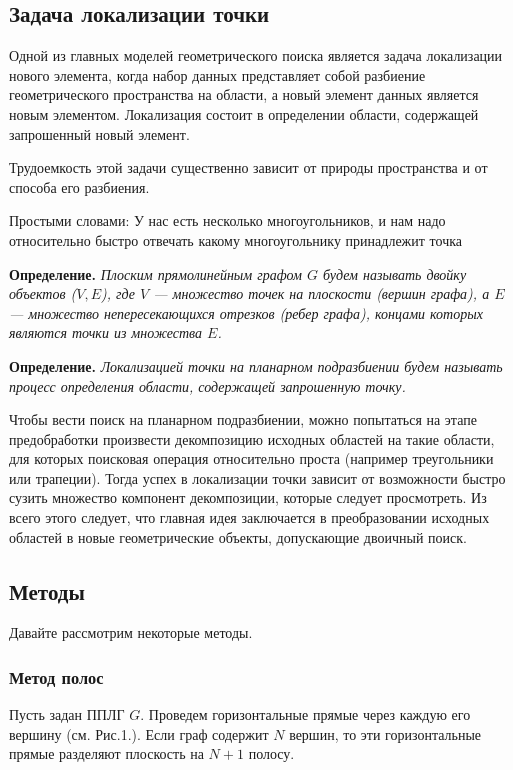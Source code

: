 \subsection{Задача локализации точки}
Одной из главных моделей геометрического поиска является задача локализации нового элемента, когда набор данных представляет собой разбиение геометрического пространства на области, а новый элемент данных является новым элементом. Локализация состоит в определении области, содержащей запрошенный новый элемент.

Трудоемкость этой задачи существенно зависит от природы пространства и от способа его разбиения.

Простыми словами:
У нас есть несколько многоугольников, и нам надо относительно быстро отвечать какому многоугольнику принадлежит точка

\textbf{Определение.} \textit{Плоским прямолинейным графом $G$ будем называть двойку объектов ($V,E$), где $V$ --- множество точек на плоскости (вершин графа), а $E$ --- множество непересекающихся отрезков (ребер графа), концами которых являются точки из множества $E$.}

\textbf{Определение.} \textit{Локализацией точки на планарном подразбиении будем называть процесс определения области, содержащей запрошенную точку.}

Чтобы вести поиск на планарном подразбиении, можно попытаться на этапе предобработки произвести декомпозицию исходных областей на такие области, для которых поисковая операция относительно проста (например треугольники или трапеции). Тогда успех в локализации точки зависит от возможности быстро сузить множество компонент декомпозиции, которые следует просмотреть. Из всего этого следует, что главная идея заключается в преобразовании исходных областей в новые геометрические объекты, допускающие двоичный поиск.

\subsection{Методы}

Давайте рассмотрим некоторые методы.
\subsubsection*{Метод полос}

Пусть задан ППЛГ $G$. Проведем горизонтальные прямые через каждую его вершину (см. Рис.1.). Если граф содержит $N$ вершин, то эти горизонтальные прямые разделяют плоскость на $N+1$ полосу.


